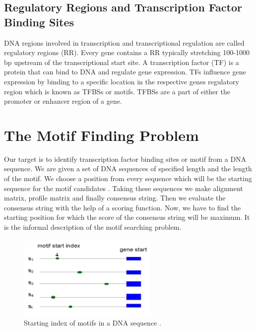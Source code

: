 \subsection{Regulatory Regions and Transcription Factor Binding Sites}
DNA regions involved in transcription and transcriptional regulation are called regulatory regions (RR). Every gene contains a RR typically stretching 100-1000 bp
upstream of the transcriptional start site. A transcription factor (TF) is a protein that can bind to DNA and regulate gene expression. TFs influence gene expression by binding to a specific location in the respective genes regulatory region which is known as TFBSs or motifs. TFBSs are a part of either the promoter or enhancer region of a gene.

\section{The Motif Finding Problem}
Our target is to identify transcription factor binding sites or motif from a DNA sequence. We are given a set of DNA sequences of specified length and the length of the motif. We choose a position from every sequence which will be the starting sequence for the motif candidates . Taking these sequences we make alignment matrix, profile matrix and finally consensus string. Then we evaluate the consensus string with the help of a scoring function. Now, we have to find the starting position for which the score of the consensus string will be maximum. It is the informal description of the motif searching problem. 

\begin{figure}%
	\centering
	\includegraphics[width=0.6\textwidth]{figures/sindex}
	\caption{Starting index of motifs in a DNA sequence .}
	\label{fig:sindex}
\end{figure}

